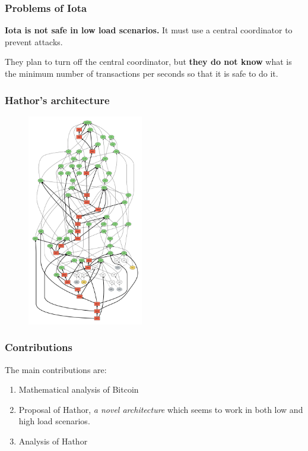 \documentclass{beamer}
\begin{document}
\begin{frame}
\frametitle{Problems of Iota}

\textbf{Iota is not safe in low load scenarios.} It must use a central coordinator to prevent attacks.

They plan to turn off the central coordinator, but \textbf{they do not know} what is the minimum number of transactions per seconds so that it is safe to do it.

\end{frame}


\begin{frame}
\frametitle{Hathor's architecture}

\begin{figure}
\centering\includegraphics[width=0.45\textwidth]{./images01/sim/hathor-2.pdf}
\end{figure}

\end{frame}


\begin{frame}
\frametitle{Contributions}

The main contributions are:
\begin{enumerate}[i]
\item Mathematical analysis of Bitcoin
\item Proposal of Hathor, \emph{a novel architecture} which seems to work in both low and high load scenarios.
\item Analysis of Hathor
\end{enumerate}
\end{frame}
\end{document}
